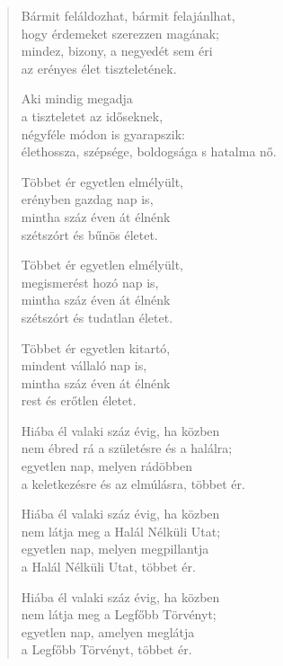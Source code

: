 \begin{verse}
 Bármit feláldozhat, bármit felajánlhat,\\
hogy érdemeket szerezzen magának;\\
mindez, bizony, a negyedét sem éri\\
az erényes élet tiszteletének.

\newpage

 Aki mindig megadja\\
a tiszteletet az időseknek,\\
négyféle módon is gyarapszik:\\
élethossza, szépsége, boldogsága s hatalma nő.

 Többet ér egyetlen elmélyült,\\
erényben gazdag nap is,\\
mintha száz éven át élnénk\\
szétszórt és bűnös életet.

 Többet ér egyetlen elmélyült,\\
megismerést hozó nap is,\\
mintha száz éven át élnénk\\
szétszórt és tudatlan életet.

 Többet ér egyetlen kitartó,\\
mindent vállaló nap is,\\
mintha száz éven át élnénk\\
rest és erőtlen életet.

 Hiába él valaki száz évig, ha közben\\
nem ébred rá a születésre és a halálra;\\
egyetlen nap, melyen rádöbben\\
a keletkezésre és az elmúlásra, többet ér.

 Hiába él valaki száz évig, ha közben\\
nem látja meg a Halál Nélküli Utat;\\
egyetlen nap, melyen megpillantja\\
a Halál Nélküli Utat, többet ér.

 Hiába él valaki száz évig, ha közben\\
nem látja meg a Legfőbb Törvényt;\\
egyetlen nap, amelyen meglátja\\
a Legfőbb Törvényt, többet ér.

\end{verse}
